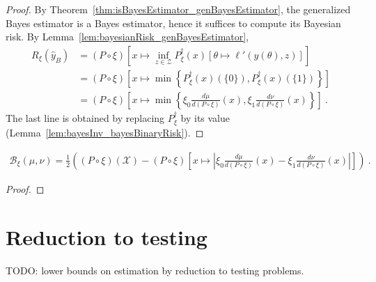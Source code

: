\begin{proof}%
{}
By Theorem~\ref{thm:isBayesEstimator_genBayesEstimator}, the generalized Bayes estimator is a Bayes estimator, hence it suffices to compute its Bayesian risk.
By Lemma~\ref{lem:bayesianRisk_genBayesEstimator},
\begin{align*}
R_\xi(\hat{y}_B)
&= (P \circ \xi)\left[x \mapsto \inf_{z \in \mathcal Z} P_\xi^\dagger(x) \left[\theta \mapsto \ell'(y(\theta), z)\right]\right]
\\
&= (P \circ \xi)\left[x \mapsto \min \left\{P_\xi^\dagger(x)(\{0\}), P_\xi^\dagger(x)(\{1\})\right\}\right]
\\
&= (P \circ \xi)\left[x \mapsto \min \left\{\xi_0\frac{d \mu}{d(P \circ \xi)}(x), \xi_1\frac{d \nu}{d(P \circ \xi)}(x)\right\}\right]
\: .
\end{align*}
The last line is obtained by replacing $P_\xi^\dagger$ by its value (Lemma~\ref{lem:bayesInv_bayesBinaryRisk}).
\end{proof}

\begin{corollary}
  \label{cor:bayesBinaryRisk_eq_abs}
  \begin{align*}
  \mathcal B_\xi(\mu, \nu) = \frac{1}{2}\left((P \circ \xi)(\mathcal X) -  (P \circ \xi)\left[x \mapsto \left\vert \xi_0\frac{d \mu}{d(P \circ \xi)}(x) - \xi_1\frac{d \nu}{d(P \circ \xi)}(x)\right\vert\right] \right)
  \: .
  \end{align*}
\end{corollary}

\begin{proof}%
\uses{}
\end{proof}


\section{Reduction to testing}

TODO: lower bounds on estimation by reduction to testing problems.